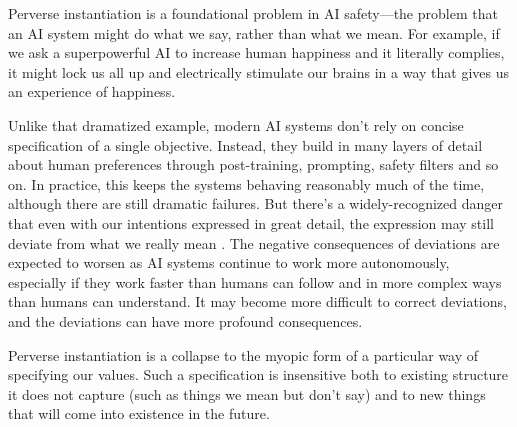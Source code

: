 \documentclass[12pt]{article}
\begin{document}
Perverse instantiation is a foundational problem in AI safety---the problem that an AI system might do what we say, rather than what we mean. For example, if we ask a superpowerful AI to increase human happiness and it literally complies, it might lock us all up and electrically stimulate our brains in a way that gives us an experience of happiness. 

Unlike that dramatized example, modern AI systems don't rely on concise specification of a single objective. Instead, they build in many layers of detail about human preferences through post-training, prompting, safety filters and so on. In practice, this keeps the systems behaving reasonably much of the time, although there are still dramatic failures. But there's a widely-recognized danger that even with our intentions expressed in great detail, the expression may still deviate from what we really mean \citep{amodei2016concrete,gabriel2020artificial,russell2019human,bostrom2014superintelligence, krakovna2020specification, grossman1986costs, hadfield2019incomplete, zhuang2020consequences, wiener1960some}. The negative consequences of deviations are expected to worsen as AI systems continue to work more autonomously, especially if they work faster than humans can follow and in more complex ways than humans can understand. It may become more difficult to correct deviations, and the deviations can have more profound consequences.

Perverse instantiation is a collapse to the myopic form of a particular way of specifying our values. Such a specification is insensitive both to existing structure it does not capture (such as things we mean but don't say) and to new things that will come into existence in the future.




\end{document}
